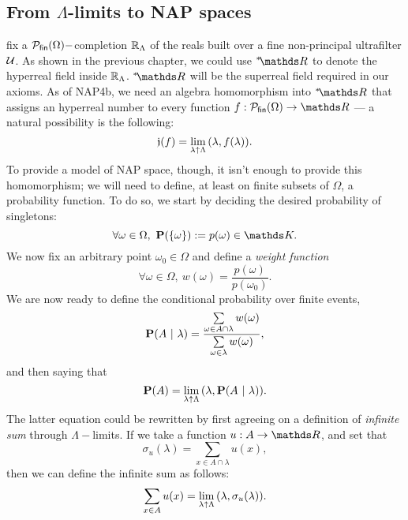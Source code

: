 \documentclass[draft.tex]{subfiles}
\begin{document}
    \subsection{From $\Lambda$-limits to NAP spaces}
    fix a $\mathcal{P}_{\mathsf{fin}}(\Omega)-$completion $\mathbb{R}_{\Lambda}$ of the reals built over a fine non-principal ultrafilter $\mathcal{U}$. As shown in the previous chapter, we could use $\ns{\RR}$ to denote the hyperreal field inside $\mathbb{R}_{\Lambda}$. $\ns{\RR}$ will be the superreal field required in our axioms. As of \textsf{NAP4b}, we need an algebra homomorphism into $\ns{\RR}$ that assigns an hyperreal number to every function $f: \finset{\Omega} \to \RR$ --- a natural possibility is the following:
	\begin{equation*}
	    \mathfrak{j}(f) = \lim\limits_{\lambda \uparrow \Lambda}{(\lambda, f(\lambda))}.
	\end{equation*}
	To provide a model of NAP space, though, it isn't enough to provide this homomorphism; we will need to define, at least on finite subsets of $\Omega$, a probability function. To do so, we start by deciding the desired probability of singletons:
	\begin{equation*}
	    \forall \omega \in \Omega, \ \prob(\{\omega\}) := p(\omega) \in \struct{K}.
	\end{equation*}
	We now fix an arbitrary point $\omega_{0} \in \Omega$ and define a \emph{weight function}
	\begin{equation*}
	    \forall \omega \in \Omega, \ w(\omega) = \frac{p(\omega)}{p(\omega_{0})}.
	\end{equation*}
    We are now ready to define the conditional probability over finite events,
    \begin{equation*}
        \textbf{P}(A \ \vert \ \lambda) = \frac{\sum\limits_{\omega \in A \cap \lambda} w(\omega)}{\sum\limits_{\omega \in \lambda} w(\omega)},
    \end{equation*}
    and then saying that
    \begin{equation}
    \label{eq:prob}
        \prob(A) = \lambdalim{(\lambda, \prob(A \ \vert \ \lambda))}.
  \end{equation}
    The latter equation could be rewritten by first agreeing on a definition of \emph{infinite sum} through $\Lambda-$limits. If we take a function $u: A \to \RR$, and set that
    \begin{equation*}
        \sigma_{u}(\lambda) = \sum\limits_{x \in A \cap \lambda} u(x),
    \end{equation*}
    then we can define the infinite sum as follows:
    \begin{equation*}
        \sum\limits_{x \in A} u(x) = \lim\limits_{\lambda \uparrow \Lambda}{(\lambda, \sigma_{u}(\lambda))}.
    \end{equation*}
\end{document}
